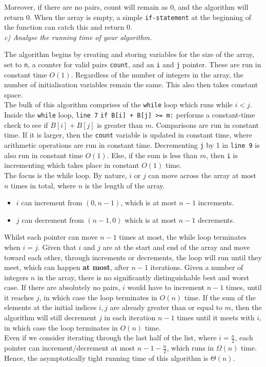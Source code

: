 \documentclass[12pt]{article}
\begin{document}
Moreover, if there are no pairs, count will remain as $0$, and the algorithm will return  $0$. When the array is empty, a simple \texttt{if-statement} at the beginning of the function can catch this and return $0$.\\


\textit{c) Analyse the running time of your algorithm.}

The algorithm begins by creating and storing variables for the size of the array, set to \texttt{n}, a counter for valid pairs \texttt{count}, and an \texttt{i} and \texttt{j} pointer. These are run in constant time $O(1)$. Regardless of the number of integers in the array, the number of initialisation variables remain the same. This also then takes constant space.\\

The bulk of this algorithm comprises of the \texttt{while} loop which runs while $i < j$. Inside the \texttt{while} loop, \texttt{line 7} \texttt{if B[i] + B[j] >= m:} performs a constant-time check to see if $B[i] + B[j]$ is greater than $m$. Comparisons are run in constant time. If it is larger, then the \texttt{count} variable is updated in constant time, where arithmetic operations are run in constant time. Decrementing \texttt{j} by 1 in \texttt{line 9} is also run in constant time $O(1)$. Else, if the sum is less than $m$, then \texttt{i} is incrementing which takes place in constant $O(1)$ time. \\

The focus is the while loop. By nature, $i$ or $j$ can move across the array at most $n$ times in total, where $n$ is the length of the array. 

\begin{itemize}
    \item $i$ can increment from $(0, n-1)$, which is at most $n-1$ increments.
    \item $j$ can decrement from $(n-1, 0)$ which is at most $n-1$ decrements.
\end{itemize}

Whilst each pointer can move $n-1$ times at most, the while loop terminates when $i = j$. Given that $i$ and $j$ are at the start and end of the array and move toward each other, through increments or decrements, the loop will run until they meet, which can happen \textbf{at most}, after $n-1$ iterations. Given a number of integers $n$ in the array, there is no significantly distinguishable best and worst case. If there are absolutely no pairs, $i$ would have to increment $n-1$ times, until it reaches $j$, in which case the loop terminates in $O(n)$ time. If the sum of the elements at the initial indices $i, j$ are already greater than or equal to $m$, then the algorithm will still decrement $j$ in each iteration $n-1$ times until it meets with $i$, in which case the loop terminates in $O(n)$ time.\\

Even if we consider iterating through the last half of the list, where $i = \frac{n}{2}$, each pointer can increment/decrement at most $n-1 - \frac{n}{2}$, which runs in $\Omega(n)$ time. Hence, the asymptotically tight running time of this algorithm is $\Theta(n)$.
\end{document}
